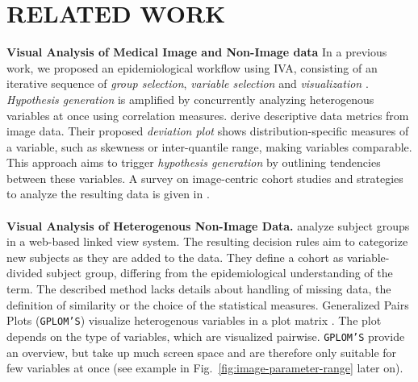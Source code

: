 \documentclass[a4paper,twoside]{style/article}
\begin{document}
\section{\uppercase{Related Work}}
\label{sec:RelatedWork}
\noindent \textbf{Visual Analysis of Medical Image and Non-Image data}
In a previous work, we proposed an epidemiological workflow using IVA, consisting of an iterative sequence of \emph{group selection}, \emph{variable selection} and \emph{visualization} \cite{Klemm2014VIS}.
\emph{Hypothesis generation} is amplified by concurrently analyzing heterogenous variables at once using correlation measures.
\cite{Turkay} derive descriptive data metrics from image data.
Their proposed \emph{deviation plot} shows distribution-specific measures of a variable, such as skewness or inter-quantile range, making variables comparable.
This approach aims to trigger \emph{hypothesis generation} by outlining tendencies between these variables.
A survey on image-centric cohort studies and strategies to analyze the resulting data is given in \cite{Preim2015}.
\\\\
\noindent \textbf{Visual Analysis of Heterogenous Non-Image Data.}
\cite{Zhang} analyze subject groups in a web-based linked view system.
The resulting decision rules aim to categorize new subjects as they are added to the data.
They define a cohort as variable-divided subject group, differing from the epidemiological understanding of the term.
The described method lacks details about handling of missing data, the definition of similarity or the choice of the statistical measures.
Generalized Pairs Plots (\texttt{GPLOM'S}) visualize heterogenous variables in a plot matrix \cite{GPLOMS}. %
The plot depends on the type of variables, which are visualized pairwise.
\texttt{GPLOM'S} provide an overview, but take up much screen space and are therefore only suitable for few variables at once (see example in Fig.~\ref{fig:image-parameter-range} later on).
\end{document}
